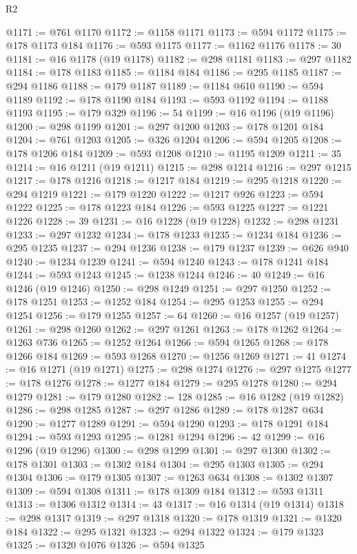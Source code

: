 \begin{lexlean}{R2}
\begin{coremodule}
@1171 := @761 @1170
@1172 := @1158 @1171
@1173 := @594 @1172
@1175 := @178 @1173 @184
@1176 := @593 @1175
@1177 := @1162 @1176
@1178 := 30
@1181 := @16 @1178 (@19 @1178)
@1182 := @298 @1181
@1183 := @297 @1182
@1184 := @178 @1183
@1185 := @1184 @184
@1186 := @295 @1185
@1187 := @294 @1186
@1188 := @179 @1187
@1189 := @1184 @610
@1190 := @594 @1189
@1192 := @178 @1190 @184
@1193 := @593 @1192
@1194 := @1188 @1193
@1195 := @179 @329
@1196 := 54
@1199 := @16 @1196 (@19 @1196)
@1200 := @298 @1199
@1201 := @297 @1200
@1203 := @178 @1201 @184
@1204 := @761 @1203
@1205 := @326 @1204
@1206 := @594 @1205
@1208 := @178 @1206 @184
@1209 := @593 @1208
@1210 := @1195 @1209
@1211 := 35
@1214 := @16 @1211 (@19 @1211)
@1215 := @298 @1214
@1216 := @297 @1215
@1217 := @178 @1216
@1218 := @1217 @184
@1219 := @295 @1218
@1220 := @294 @1219
@1221 := @179 @1220
@1222 := @1217 @926
@1223 := @594 @1222
@1225 := @178 @1223 @184
@1226 := @593 @1225
@1227 := @1221 @1226
@1228 := 39
@1231 := @16 @1228 (@19 @1228)
@1232 := @298 @1231
@1233 := @297 @1232
@1234 := @178 @1233
@1235 := @1234 @184
@1236 := @295 @1235
@1237 := @294 @1236
@1238 := @179 @1237
@1239 := @626 @940
@1240 := @1234 @1239
@1241 := @594 @1240
@1243 := @178 @1241 @184
@1244 := @593 @1243
@1245 := @1238 @1244
@1246 := 40
@1249 := @16 @1246 (@19 @1246)
@1250 := @298 @1249
@1251 := @297 @1250
@1252 := @178 @1251
@1253 := @1252 @184
@1254 := @295 @1253
@1255 := @294 @1254
@1256 := @179 @1255
@1257 := 64
@1260 := @16 @1257 (@19 @1257)
@1261 := @298 @1260
@1262 := @297 @1261
@1263 := @178 @1262
@1264 := @1263 @736
@1265 := @1252 @1264
@1266 := @594 @1265
@1268 := @178 @1266 @184
@1269 := @593 @1268
@1270 := @1256 @1269
@1271 := 41
@1274 := @16 @1271 (@19 @1271)
@1275 := @298 @1274
@1276 := @297 @1275
@1277 := @178 @1276
@1278 := @1277 @184
@1279 := @295 @1278
@1280 := @294 @1279
@1281 := @179 @1280
@1282 := 128
@1285 := @16 @1282 (@19 @1282)
@1286 := @298 @1285
@1287 := @297 @1286
@1289 := @178 @1287 @634
@1290 := @1277 @1289
@1291 := @594 @1290
@1293 := @178 @1291 @184
@1294 := @593 @1293
@1295 := @1281 @1294
@1296 := 42
@1299 := @16 @1296 (@19 @1296)
@1300 := @298 @1299
@1301 := @297 @1300
@1302 := @178 @1301
@1303 := @1302 @184
@1304 := @295 @1303
@1305 := @294 @1304
@1306 := @179 @1305
@1307 := @1263 @634
@1308 := @1302 @1307
@1309 := @594 @1308
@1311 := @178 @1309 @184
@1312 := @593 @1311
@1313 := @1306 @1312
@1314 := 43
@1317 := @16 @1314 (@19 @1314)
@1318 := @298 @1317
@1319 := @297 @1318
@1320 := @178 @1319
@1321 := @1320 @184
@1322 := @295 @1321
@1323 := @294 @1322
@1324 := @179 @1323
@1325 := @1320 @1076
@1326 := @594 @1325

\end{coremodule}
\end{lexlean}
